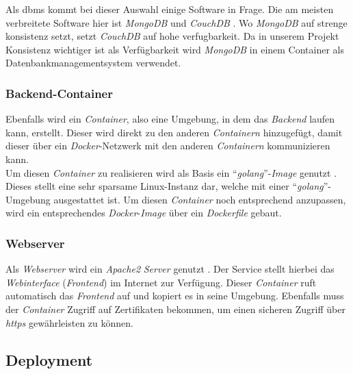 		Als \gls{dbms} kommt bei dieser Auswahl einige Software in Frage. Die am meisten verbreitete Software hier ist \textit{MongoDB} und \textit{CouchDB} \cite{mongo}. Wo \textit{MongoDB} auf strenge \gls{konsistenz} setzt, setzt \textit{CouchDB} auf hohe \gls{verfugbarkeit}. Da in unserem Projekt Konsistenz wichtiger ist als Verfügbarkeit wird \textit{MongoDB} in einem Container als Datenbankmanagementsystem verwendet.
		
		\subsubsection{Backend-Container}
		
		Ebenfalls wird ein \textit{Container}, also eine Umgebung, in dem das \textit{Backend} laufen kann, erstellt. Dieser wird direkt zu den anderen \textit{Containern} hinzugefügt, damit dieser über ein \textit{Docker}-Netzwerk mit den anderen \textit{Containern} kommunizieren kann.~\\
		Um diesen \textit{Container} zu realisieren wird als Basis ein \enquote{\textit{golang}}-\textit{Image} genutzt \cite{golang}. Dieses stellt eine sehr sparsame Linux-Instanz dar, welche mit einer \enquote{\textit{golang}}-Umgebung ausgestattet ist. Um diesen \textit{Container} noch entsprechend anzupassen, wird ein entsprechendes \textit{Docker}-\textit{Image} über ein \textit{Dockerfile} gebaut.
		
		\subsubsection{Webserver}
		
		Als \textit{Webserver} wird ein \textit{Apache2} \textit{Server} genutzt \cite{apache}. Der Service stellt hierbei das \textit{Webinterface} (\textit{Frontend}) im Internet zur Verfügung. Dieser \textit{Container} ruft automatisch das \textit{Frontend} auf und kopiert es in seine Umgebung. Ebenfalls muss der \textit{Container} Zugriff auf Zertifikaten bekommen, um einen sicheren Zugriff über \textit{\gls{https}} gewährleisten zu können.
				
	\subsection{Deployment}
	
